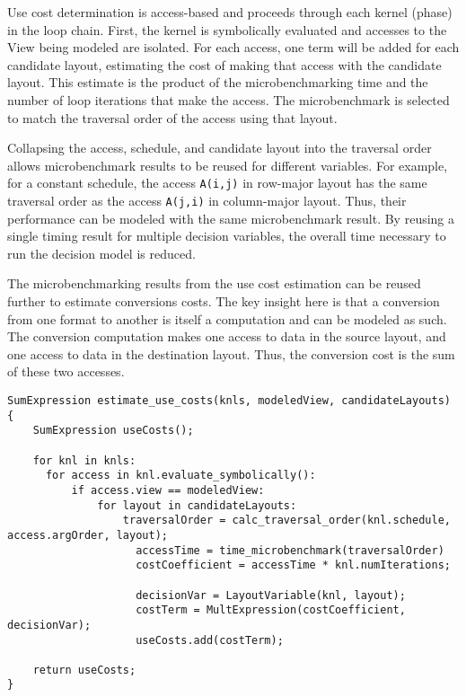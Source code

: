 Use cost determination is access-based and proceeds through each kernel (phase) in the loop chain.
First, the kernel is symbolically evaluated and accesses to the View being modeled are isolated.
For each access, one term will be added for each candidate layout, estimating the cost of making that access with the candidate layout.
This estimate is the product of the microbenchmarking time and the number of loop iterations that make the access.
The microbenchmark is selected to match the traversal order of the access using that layout.

Collapsing the access, schedule, and candidate layout into the traversal order allows microbenchmark results to be reused for different variables. 
For example, for a constant schedule, the access \verb.A(i,j). in row-major layout has the same traversal order as the access \verb.A(j,i). in column-major layout.
Thus, their performance can be modeled with the same microbenchmark result. 
By reusing a single timing result for multiple decision variables, the overall time necessary to run the decision model is reduced.

The microbenchmarking results from the use cost estimation can be reused further to estimate conversions costs.
The key insight here is that a conversion from one format to another is itself a computation and can be modeled as such.
The conversion computation makes one access to data in the source layout, and one access to data in the destination layout. 
Thus, the conversion cost is the sum of these two accesses.


\begin{lstlisting}[caption={Algorithm for generating the objective function's use cost terms.}]
SumExpression estimate_use_costs(knls, modeledView, candidateLayouts) {
	SumExpression useCosts();

	for knl in knls:
	  for access in knl.evaluate_symbolically():
		  if access.view == modeledView:
			  for layout in candidateLayouts:
				  traversalOrder = calc_traversal_order(knl.schedule, access.argOrder, layout);
					accessTime = time_microbenchmark(traversalOrder)
					costCoefficient = accessTime * knl.numIterations;

					decisionVar = LayoutVariable(knl, layout);
					costTerm = MultExpression(costCoefficient, decisionVar);
					useCosts.add(costTerm);
	
	return useCosts;
}
\end{lstlisting}

